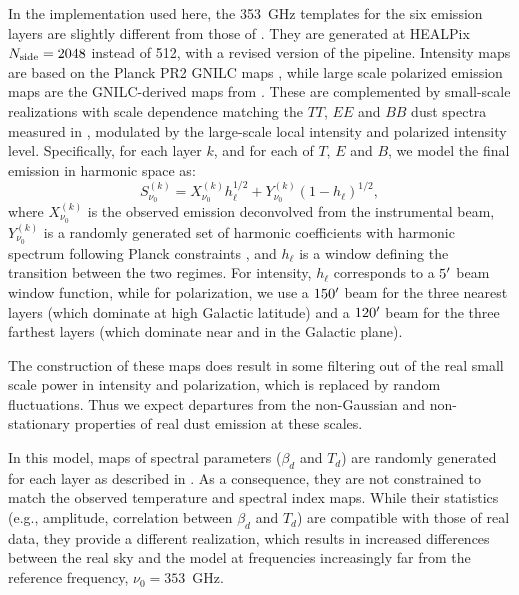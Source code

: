 \documentclass[twocolumn]{aastex631}
\begin{document}
In the implementation used here, the 353~GHz templates for the six emission layers are slightly different from those of \cite{Martinez-Solaeche:2018}. They are generated at HEALPix $N_{\rm side} = 2048$ instead of 512, with a revised version of the pipeline. Intensity maps are based on the Planck PR2 GNILC maps \citep{planck2016-XLVIII}, while large scale polarized emission maps are the GNILC-derived maps from \cite{Martinez-Solaeche:2018}. These are complemented by small-scale realizations with scale dependence matching the $TT$, $EE$ and $BB$ dust spectra measured in \cite{planck2016-l11A}, modulated by the large-scale local intensity and polarized intensity level. Specifically, for each layer $k$, and for each of $T$, $E$ and $B$, we model the final emission in harmonic space as:
\begin{equation}
    S^{(k)}_{\nu_0} = X^{(k)}_{\nu_0} h_\ell^{1/2} + Y^{(k)}_{\nu_0} (1-h_\ell)^{1/2},
\end{equation}
where $X^{(k)}_{\nu_0}$ is the observed emission deconvolved from the instrumental beam, $Y^{(k)}_{\nu_0}$ is a randomly generated set of harmonic coefficients with harmonic spectrum following Planck constraints \citep{planck2016-l11A}, and $h_\ell$ is a window defining the transition between the two regimes. For intensity, $h_\ell$ corresponds to a $5\mbox{$^\prime$}$ beam window function, while for polarization, we use a $150\mbox{$^\prime$}$ beam for the three nearest layers (which dominate at high Galactic latitude) and a $120\mbox{$^\prime$}$ beam for the three farthest layers (which dominate near and in the Galactic plane).

The construction of these maps does result in some filtering out of the real small scale power in intensity and polarization, which is replaced by random fluctuations. Thus we expect departures from the non-Gaussian and non-stationary properties of real dust emission at these scales.

In this model, maps of spectral parameters ($\beta_d$ and $T_d$) are randomly generated for each layer as described in \cite{Martinez-Solaeche:2018}. As a consequence, they are not constrained to match the observed temperature and spectral index maps. While their statistics (e.g., amplitude, correlation between $\beta_d$ and $T_d$) are compatible with those of real data, they provide a different realization, which results in increased differences between the real sky and the model at frequencies increasingly far from the reference frequency, $\nu_0 = 353$~GHz.
\end{document}
